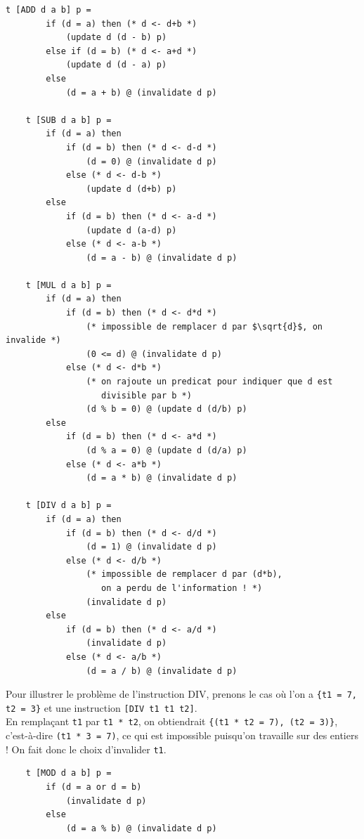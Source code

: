 \documentclass[french]{article}
\begin{document}
  \begin{lstlisting}[mathescape] % TODO: on a oublie un cas, a changer dans le code aussi !!! (ADD et SUB)
    t [ADD d a b] p =
        if (d = a) then (* d <- d+b *)
            (update d (d - b) p)
        else if (d = b) (* d <- a+d *)
            (update d (d - a) p)
        else
            (d = a + b) @ (invalidate d p)

    t [SUB d a b] p =
        if (d = a) then
            if (d = b) then (* d <- d-d *)
                (d = 0) @ (invalidate d p)
            else (* d <- d-b *)
                (update d (d+b) p)
        else
            if (d = b) then (* d <- a-d *)
                (update d (a-d) p)
            else (* d <- a-b *)
                (d = a - b) @ (invalidate d p)

    t [MUL d a b] p =
        if (d = a) then
            if (d = b) then (* d <- d*d *)
                (* impossible de remplacer d par $\sqrt{d}$, on invalide *)
                (0 <= d) @ (invalidate d p)
            else (* d <- d*b *)
                (* on rajoute un predicat pour indiquer que d est
                   divisible par b *)
                (d % b = 0) @ (update d (d/b) p)
        else
            if (d = b) then (* d <- a*d *)
                (d % a = 0) @ (update d (d/a) p)
            else (* d <- a*b *)
                (d = a * b) @ (invalidate d p)

    t [DIV d a b] p =
        if (d = a) then
            if (d = b) then (* d <- d/d *)
                (d = 1) @ (invalidate d p)
            else (* d <- d/b *)
                (* impossible de remplacer d par (d*b),
                   on a perdu de l'information ! *)
                (invalidate d p)
        else
            if (d = b) then (* d <- a/d *)
                (invalidate d p)
            else (* d <- a/b *)
                (d = a / b) @ (invalidate d p)
  \end{lstlisting}

  Pour illustrer le problème de l'instruction DIV, prenons le cas où l'on a \texttt{\{t1 = 7, t2 = 3\}} et une instruction \texttt{[DIV t1 t1 t2]}.\\
  En remplaçant \texttt{t1} par \texttt{t1 * t2}, on obtiendrait \texttt{\{(t1 * t2 = 7), (t2 = 3)\}}, c'est-à-dire \texttt{(t1 * 3 = 7)}, ce qui est impossible puisqu'on travaille sur des entiers ! On fait donc le choix d'invalider \texttt{t1}.

  \begin{lstlisting}
    t [MOD d a b] p =
        if (d = a or d = b)
            (invalidate d p)
        else
            (d = a % b) @ (invalidate d p)
  \end{lstlisting}
\end{document}
